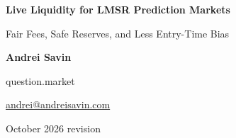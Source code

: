 \documentclass[10pt]{article}
\begin{document}
\begin{center}
{\LARGE\bfseries Live Liquidity for LMSR Prediction Markets\par}
\vspace{0.4em}
{\large Fair Fees, Safe Reserves, and Less Entry-Time Bias\par}
\vspace{1.2em}
{\normalsize\bfseries Andrei Savin\par}
\vspace{0.3em}
{\small question.market\par}
{\small\href{mailto:andrei@andreisavin.com}{andrei@andreisavin.com}\par}
\vspace{0.6em}
{\small October 2026 revision\par}
\end{center}

\vspace{0.8em}
\end{document}
